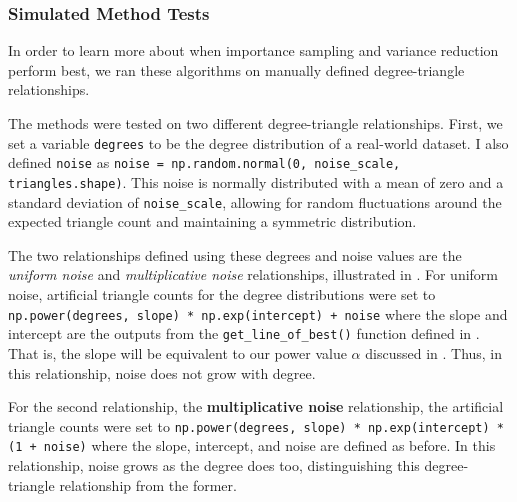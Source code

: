 \documentclass[11pt, margin=1in]{article}
\begin{document}
\subsubsection{Simulated Method Tests}
\label{sec:methods-simulated-test}

In order to learn more about when importance sampling and variance reduction perform best, we ran these algorithms on manually defined degree-triangle relationships.

The methods were tested on two different degree-triangle relationships.
First, we set a variable \lstinline{degrees} to be the degree distribution of a real-world dataset.
I also defined \lstinline{noise} as \lstinline{noise = np.random.normal(0, noise_scale, triangles.shape)}.
This noise is normally distributed with a mean of zero and a standard deviation of \lstinline{noise_scale}, allowing for random fluctuations around the expected triangle count and maintaining a symmetric distribution.

The two relationships defined using these degrees and noise values are the \emph{uniform noise} and \emph{multiplicative noise} relationships, illustrated in .
For uniform noise, artificial triangle counts for the degree distributions were set to \lstinline{np.power(degrees, slope) * np.exp(intercept) + noise} where the slope and intercept are the outputs from the \lstinline{get_line_of_best()} function defined in .
That is, the slope will be equivalent to our power value $\alpha$ discussed in .
Thus, in this relationship, noise does not grow with degree.

For the second relationship, the \textbf{multiplicative noise} relationship, the artificial triangle counts were set to \lstinline{np.power(degrees, slope) * np.exp(intercept) * (1 + noise)} where the slope, intercept, and noise are defined as before.
In this relationship, noise grows as the degree does too, distinguishing this degree-triangle relationship from the former.
\end{document}
